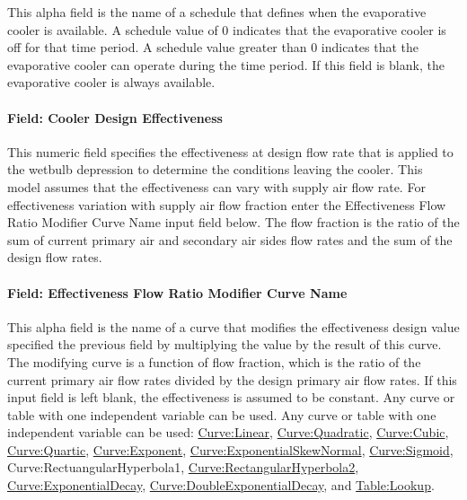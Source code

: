 This alpha field is the name of a schedule that defines when the evaporative cooler is available. A schedule value of 0 indicates that the evaporative cooler is off for that time period. A schedule value greater than 0 indicates that the evaporative cooler can operate during the time period. If this field is blank, the evaporative cooler is always available.

\paragraph{Field: Cooler Design Effectiveness}\label{field-cooler-design-effectiveness}

This numeric field specifies the effectiveness at design flow rate that is applied to the wetbulb depression to determine the conditions leaving the cooler. This model assumes that the effectiveness can vary with supply air flow rate. For effectiveness variation with supply air flow fraction enter the Effectiveness Flow Ratio Modifier Curve Name input field below. The flow fraction is the ratio of the sum of current primary air and secondary air sides flow rates and the sum of the design flow rates.

\paragraph{Field: Effectiveness Flow Ratio Modifier Curve Name}\label{field-effectiveness-flow-ratio-modifier-curve-name}

This alpha field is the name of a curve that modifies the effectiveness design value specified the previous field by multiplying the value by the result of this curve. The modifying curve is a function of flow fraction, which is the ratio of the current primary air flow rates divided by the design primary air flow rates. If this input field is left blank, the effectiveness is assumed to be constant. Any curve or table with one independent variable can be used. Any curve or table with one independent variable can be used: \hyperref[curvelinear]{Curve:Linear}, \hyperref[curvequadratic]{Curve:Quadratic}, \hyperref[curvecubic]{Curve:Cubic}, \hyperref[curvequartic]{Curve:Quartic}, \hyperref[curveexponent]{Curve:Exponent}, \hyperref[curveexponentialskewnormal]{Curve:ExponentialSkewNormal}, \hyperref[curvesigmoid]{Curve:Sigmoid}, Curve:RectuangularHyperbola1, \hyperref[curverectangularhyperbola2]{Curve:RectangularHyperbola2}, \hyperref[curveexponentialdecay]{Curve:ExponentialDecay}, \hyperref[curvedoubleexponentialdecay]{Curve:DoubleExponentialDecay}, and \hyperref[tablelookup]{Table:Lookup}.

